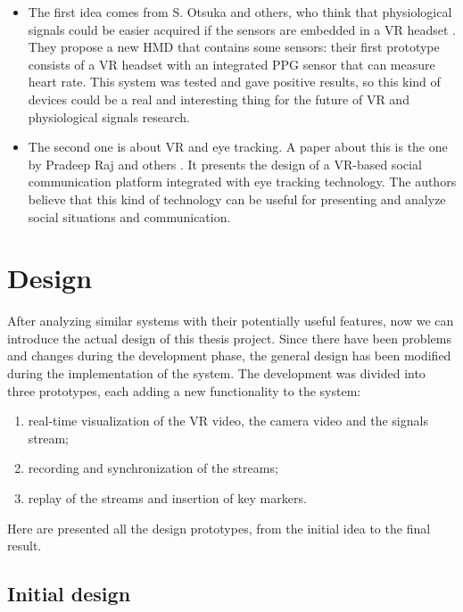 \documentclass[binding=0.6cm,LaM]{sapthesis}
\begin{document}
\begin{itemize}

\item The first idea comes from S. Otsuka and others, who think that physiological signals could be easier acquired if the sensors are embedded in a VR headset \cite{otsuka2017physiological}. They propose a new HMD that contains some sensors: their first prototype consists of a VR headset with an integrated PPG sensor that can measure heart rate. This system was tested and gave positive results, so this kind of devices could be a real and interesting thing for the future of VR and physiological signals research.

\item The second one is about VR and eye tracking. A paper about this is the one by Pradeep Raj and others \cite{kb2017gaze}. It presents the design of a VR-based social communication platform integrated with eye tracking technology. The authors believe that this kind of technology can be useful for presenting and analyze social situations and communication.

\end{itemize}

\section{Design}
\label{sec:design}
After analyzing similar systems with their potentially useful features, now we can introduce the actual design of this thesis project. 
Since there have been problems and changes during the development phase, the general design has been modified during the implementation of the system. 
The development was divided into three prototypes, each adding a new functionality to the system:

\begin{enumerate}
\item real-time visualization of the VR video, the camera video and the signals stream;
\item recording and synchronization of the streams;
\item replay of the streams and insertion of key markers.
\end{enumerate} 

Here are presented all the design prototypes, from the initial idea to the final result.

\subsection{Initial design}
\end{document}
